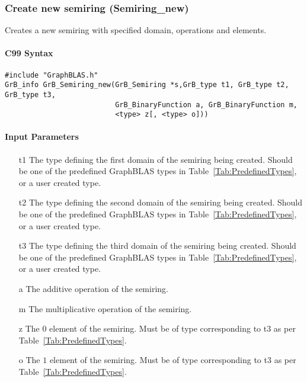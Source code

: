 \subsubsection{Create new semiring ({\sf Semiring\_new})}

Creates a new semiring with specified domain, operations and elements.

\paragraph{C99 Syntax}

\begin{verbatim}
#include "GraphBLAS.h"
GrB_info GrB_Semiring_new(GrB_Semiring *s,GrB_type t1, GrB_type t2, GrB_type t3,
                          GrB_BinaryFunction a, GrB_BinaryFunction m,
                          <type> z[, <type> o]))
\end{verbatim}


\paragraph{Input Parameters}

\begin{itemize}
	\item[{\sf t1}] The type defining the first domain of the semiring being created. Should be one of the predefined
	GraphBLAS types in Table~\ref{Tab:PredefinedTypes}, or a user created type.
	\item[{\sf t2}] The type defining the second domain of the semiring being created. Should be one of the predefined
	GraphBLAS types in Table~\ref{Tab:PredefinedTypes}, or a user created type.
	\item[{\sf t3}] The type defining the third domain of the semiring being created. Should be one of the predefined
	GraphBLAS types in Table~\ref{Tab:PredefinedTypes}, or a user created type.
	\item[{\sf a}] The additive operation of the semiring.
	\item[{\sf m}] The multiplicative operation of the semiring.
	\item[{\sf z}] The $0$ element of the semiring. Must be of type corresponding to {\sf t3} as per Table~\ref{Tab:PredefinedTypes}.
	\item[{\sf o}] The $1$ element of the semiring. Must be of type corresponding to {\sf t3} as per Table~\ref{Tab:PredefinedTypes}.
\end{itemize}

